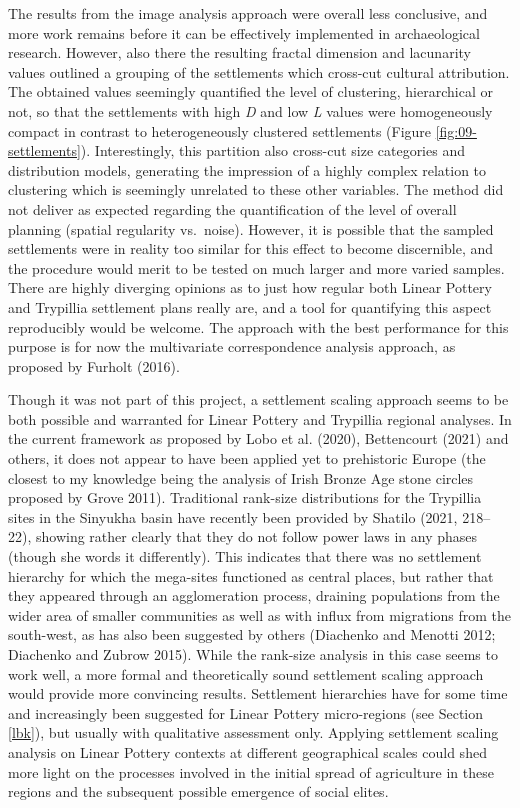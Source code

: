 \documentclass[
  12pt,
  a4paper, twoside]{book}
\begin{document}
The results from the image analysis approach were overall less conclusive, and more work remains before it can be effectively implemented in archaeological research. However, also there the resulting fractal dimension and lacunarity values outlined a grouping of the settlements which cross-cut cultural attribution. The obtained values seemingly quantified the level of clustering, hierarchical or not, so that the settlements with high \emph{D} and low \emph{L} values were homogeneously compact in contrast to heterogeneously clustered settlements (Figure \ref{fig:09-settlements}). Interestingly, this partition also cross-cut size categories and distribution models, generating the impression of a highly complex relation to clustering which is seemingly unrelated to these other variables. The method did not deliver as expected regarding the quantification of the level of overall planning (spatial regularity vs.~noise). However, it is possible that the sampled settlements were in reality too similar for this effect to become discernible, and the procedure would merit to be tested on much larger and more varied samples. There are highly diverging opinions as to just how regular both Linear Pottery and Trypillia settlement plans really are, and a tool for quantifying this aspect reproducibly would be welcome. The approach with the best performance for this purpose is for now the multivariate correspondence analysis approach, as proposed by Furholt (2016).

Though it was not part of this project, a settlement scaling approach seems to be both possible and warranted for Linear Pottery and Trypillia regional analyses. In the current framework as proposed by Lobo et al. (2020), Bettencourt (2021) and others, it does not appear to have been applied yet to prehistoric Europe (the closest to my knowledge being the analysis of Irish Bronze Age stone circles proposed by Grove 2011). Traditional rank-size distributions for the Trypillia sites in the Sinyukha basin have recently been provided by Shatilo (2021, 218--22), showing rather clearly that they do not follow power laws in any phases (though she words it differently). This indicates that there was no settlement hierarchy for which the mega-sites functioned as central places, but rather that they appeared through an agglomeration process, draining populations from the wider area of smaller communities as well as with influx from migrations from the south-west, as has also been suggested by others (Diachenko and Menotti 2012; Diachenko and Zubrow 2015). While the rank-size analysis in this case seems to work well, a more formal and theoretically sound settlement scaling approach would provide more convincing results. Settlement hierarchies have for some time and increasingly been suggested for Linear Pottery micro-regions (see Section \ref{lbk}), but usually with qualitative assessment only. Applying settlement scaling analysis on Linear Pottery contexts at different geographical scales could shed more light on the processes involved in the initial spread of agriculture in these regions and the subsequent possible emergence of social elites.
\end{document}
